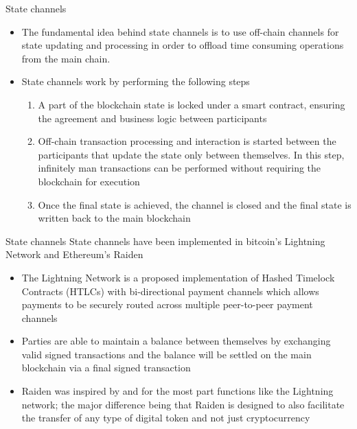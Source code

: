 \documentclass[9pt]{beamer}
\begin{document}
\begin{frame}{State channels}
	\begin{itemize}
		\item The fundamental idea behind state channels is to use off-chain channels for state updating and processing in order to offload time consuming operations from the main chain.
		\item State channels work by performing the following steps
		\begin{enumerate}
			\item A part of the blockchain state is locked under a smart contract, ensuring the agreement and business logic between participants
			\item Off-chain transaction processing and interaction is started between the participants that update the state only between themselves. In this step, infinitely man transactions can be performed without requiring the blockchain for execution
			\item Once the final state is achieved, the channel is closed and the final state is written back to the main blockchain
		\end{enumerate}
	\end{itemize}
\end{frame}

\begin{frame}{State channels}
	State channels have been implemented in bitcoin's Lightning Network and Ethereum's Raiden
	\begin{itemize}
		\item The Lightning Network is a proposed implementation of Hashed Timelock Contracts (HTLCs) with bi-directional payment channels which allows payments to be securely routed across multiple peer-to-peer payment channels
		\item Parties are able to maintain a balance between themselves by exchanging valid signed transactions and the balance will be settled on the main blockchain via a final signed
		transaction
		\item Raiden was inspired by and for the most part functions like the Lightning network; the major difference being that Raiden is designed to also facilitate the transfer of any type of digital token and not just cryptocurrency
	\end{itemize}
\end{frame}

\end{document}
